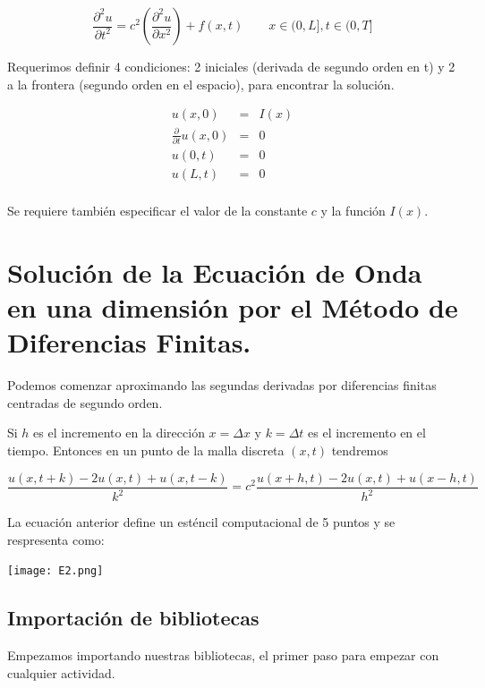 \documentclass[12pt]{article}
\begin{document}
\begin{equation*}
\frac{\partial^2 u}{\partial t^2} = c^2 \left( 
  \frac{\partial^2 u}{\partial x^2}
   \right) + f(x,t) \qquad x \in (0,L], t \in (0,T]
\end{equation*}

Requerimos definir 4 condiciones: 2 iniciales (derivada de segundo orden en t) y 2 a la frontera (segundo orden en el espacio), para encontrar la solución.

\begin{eqnarray*}
u(x,0) & = & I(x) \\
\frac{\partial}{\partial t} u(x,0) & = & 0 \\
u(0,t) & = & 0 \\
u(L,t) & = & 0 \\
\end{eqnarray*}

Se requiere también especificar el valor de la constante $c$ y la función $I(x)$.





\section{Solución de la Ecuación de Onda en una dimensión por el Método de Diferencias Finitas.}

Podemos comenzar aproximando las segundas derivadas por diferencias finitas centradas de segundo orden.

Si $h$ es el incremento en la dirección $x=\Delta x$ y $k=\Delta t$ es el incremento en el tiempo. Entonces en un punto de la malla discreta $(x,t)$ tendremos

\begin{equation*}
\frac{u(x,t+k) -2u(x,t) + u(x,t-k)}{k^2} = c^2
\frac{u(x+h,t) -2u(x,t) + u(x-h,t)}{h^2}
\end{equation*}

La ecuación anterior define un esténcil computacional de 5 puntos y se respresenta como:

\begin{center}
    \texttt{[image: E2.png]}
\end{center}




\subsection*{Importación de bibliotecas}
Empezamos importando nuestras bibliotecas, el primer paso para empezar con cualquier actividad.
\end{document}
